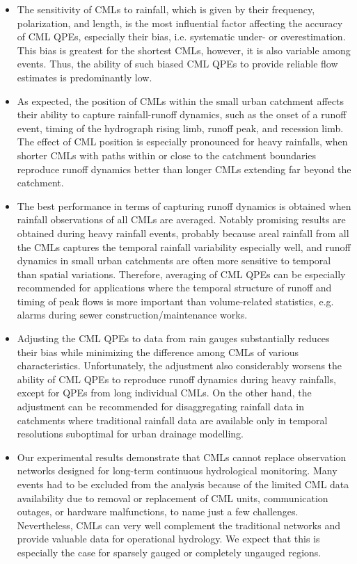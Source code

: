 \documentclass{ctuthesis}\usepackage[]{graphicx}\usepackage[]{color}
\begin{document}
\begin{itemize}
        \item The sensitivity of CMLs to rainfall, which is given by their frequency, polarization, and length, is the most influential factor affecting the accuracy of CML QPEs, especially their bias, i.e. systematic under- or overestimation. This bias is greatest for the shortest CMLs, however, it is also variable among events. Thus, the ability of such biased CML QPEs to provide reliable flow estimates is predominantly low.
        
        \item As expected, the position of CMLs within the small urban catchment affects their ability to capture rainfall-runoff dynamics, such as the onset of a runoff event, timing of the hydrograph rising limb, runoff peak, and recession limb. The effect of CML position is especially pronounced for heavy rainfalls, when shorter CMLs with paths within or close to the catchment boundaries reproduce runoff dynamics better than longer CMLs extending far beyond the catchment.
        
        \item The best performance in terms of capturing runoff dynamics is obtained when rainfall observations of all CMLs are averaged. Notably promising results are obtained during heavy rainfall events, probably because areal rainfall from all the CMLs captures the temporal rainfall variability especially well, and runoff dynamics in small urban catchments are often more sensitive to temporal than spatial variations. Therefore, averaging of CML QPEs can be especially recommended for applications where the temporal structure of runoff and timing of peak flows is more important than volume-related statistics, e.g. alarms during sewer construction/maintenance works.
        
        \item Adjusting the CML QPEs to data from rain gauges substantially reduces their bias while minimizing the difference among CMLs of various characteristics. Unfortunately, the adjustment also considerably worsens the ability of CML QPEs to reproduce runoff dynamics during heavy rainfalls, except for QPEs from long individual CMLs. On the other hand, the adjustment can be recommended for disaggregating rainfall data in catchments where traditional rainfall data are available only in temporal resolutions suboptimal for urban drainage modelling.
        
        \item Our experimental results demonstrate that CMLs cannot replace observation networks designed for long-term continuous hydrological monitoring. Many events had to be excluded from the analysis because of the limited CML data availability due to removal or replacement of CML units, communication outages, or hardware malfunctions, to name just a few challenges. Nevertheless, CMLs can very well complement the traditional networks and provide valuable data for operational hydrology. We expect that this is especially the case for sparsely gauged or completely ungauged regions.

\end{itemize}
\end{document}
